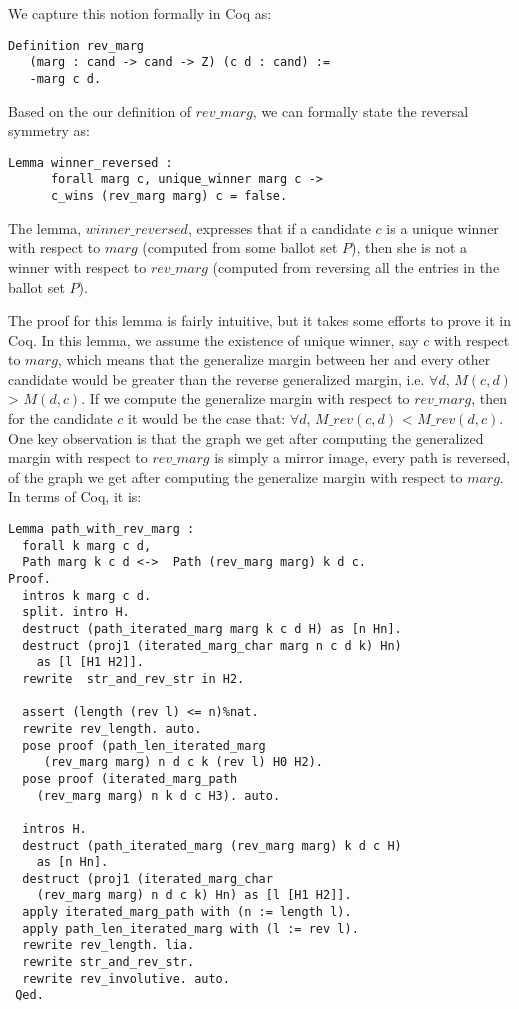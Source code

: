 We capture this notion formally in Coq as:

\begin{verbatim}
Definition rev_marg 
   (marg : cand -> cand -> Z) (c d : cand) :=
   -marg c d.
\end{verbatim}

Based on the our definition of $rev\_marg$, we can formally state the reversal symmetry as:
\begin{verbatim}
Lemma winner_reversed :
      forall marg c, unique_winner marg c ->
      c_wins (rev_marg marg) c = false.
\end{verbatim}

The lemma, $winner\_reversed$, expresses that if a candidate $c$ is a unique winner 
with respect to $marg$ (computed from some ballot set $P$), then she is not a winner with respect 
to $rev\_marg$ (computed from reversing all the entries in the ballot set $P$).


The proof for this lemma is fairly intuitive, but it takes some efforts to prove it in Coq. 
In this lemma, we assume the 
existence of unique winner, say $c$ with respect to $marg$, which means that the generalize 
margin between her and every other candidate would be greater than the reverse generalized 
margin, i.e.  $\forall d$, $M (c, d)$ > $M (d, c)$. 
If we compute the generalize margin with respect to $rev\_marg$, then 
for the candidate $c$ it would be the case that:  
$\forall d$, $M\_rev (c, d)$ <  $M\_rev (d, c)$. 
One key observation is that the graph we get after computing the generalized margin with respect to $rev\_marg$ is 
simply a mirror image, every path is reversed, of the graph we get after computing the generalize margin with respect to $marg$. 
In terms of Coq, it is:
\begin{verbatim}
Lemma path_with_rev_marg :
  forall k marg c d,
  Path marg k c d <->  Path (rev_marg marg) k d c.
Proof.
  intros k marg c d.
  split. intro H. 
  destruct (path_iterated_marg marg k c d H) as [n Hn].
  destruct (proj1 (iterated_marg_char marg n c d k) Hn) 
    as [l [H1 H2]].
  rewrite  str_and_rev_str in H2.

  assert (length (rev l) <= n)%nat.
  rewrite rev_length. auto.
  pose proof (path_len_iterated_marg 
     (rev_marg marg) n d c k (rev l) H0 H2).
  pose proof (iterated_marg_path 
    (rev_marg marg) n k d c H3). auto. 
      
  intros H. 
  destruct (path_iterated_marg (rev_marg marg) k d c H) 
    as [n Hn].  
  destruct (proj1 (iterated_marg_char 
    (rev_marg marg) n d c k) Hn) as [l [H1 H2]].
  apply iterated_marg_path with (n := length l).
  apply path_len_iterated_marg with (l := rev l).
  rewrite rev_length. lia. 
  rewrite str_and_rev_str.
  rewrite rev_involutive. auto.
 Qed.
    
\end{verbatim}

